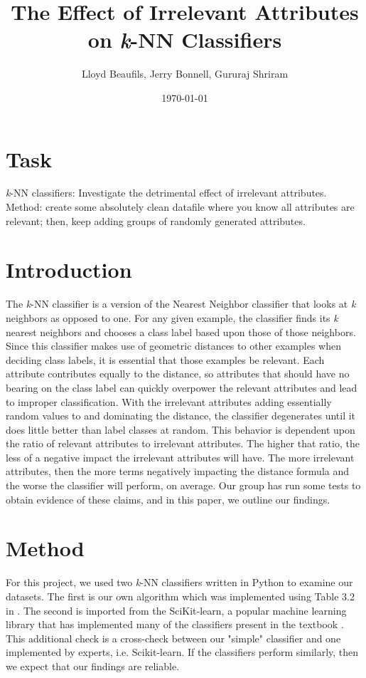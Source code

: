\documentclass{article}
\title{%
       The Effect of Irrelevant Attributes on \textit{\textit{k}}-NN Classifiers}
\author{Lloyd Beaufils, Jerry Bonnell, Gururaj Shriram}
\date{\today}
\begin{document}
\maketitle

\section{Task}

\textit{\textit{k}}-NN classifiers: Investigate the detrimental effect of irrelevant attributes. Method: create some absolutely clean datafile where you know all attributes are relevant; then, keep adding groups of randomly generated attributes.

\section{Introduction}

The \textit{\textit{k}}-NN classifier is a version of the Nearest Neighbor classifier that looks at \textit{\textit{k}} neighbors as opposed to one. For any given example, the classifier finds its \textit{\textit{k}} nearest neighbors and chooses a class label based upon those of those neighbors. Since this classifier makes use of geometric distances to other examples when deciding class labels, it is essential that those examples be relevant. Each attribute contributes equally to the distance, so attributes that should have no bearing on the class label can quickly overpower the relevant attributes and lead to improper classification. With the irrelevant attributes adding essentially random values to and dominating the distance, the classifier degenerates until it does little better than label classes at random. This behavior is dependent upon the ratio of relevant attributes to irrelevant attributes. The higher that ratio, the less of a negative impact the irrelevant attributes will have. The more irrelevant attributes, then the more terms negatively impacting the distance formula and the worse the classifier will perform, on average. Our group has run some tests to obtain evidence of these claims, and in this paper, we outline our findings.

\section{Method}

For this project, we used two \textit{k}-NN classifiers written in Python to examine our datasets. The first is our own algorithm which was implemented using Table 3.2 in \cite{kubat}. The second is imported from the SciKit-learn, a popular machine learning library that has implemented many of the classifiers present in the textbook \cite{scikit}. This additional check is a cross-check between our "simple" classifier and one implemented by experts, i.e. Scikit-learn. If the classifiers perform similarly, then we expect that our findings are reliable.  \\  
\end{document}
